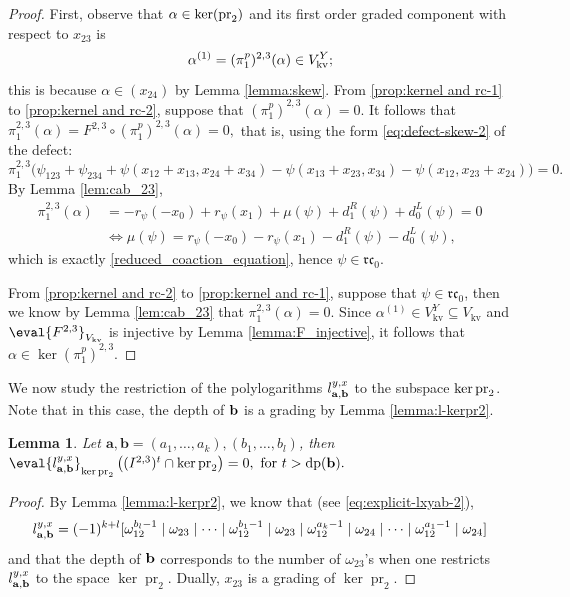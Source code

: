 \documentclass[a4paper,fleqn]{cas-sc}
\newtheorem{lemma}[theorem]{Lemma}
\DeclareMathOperator{\dpt}{dp}
\DeclareMathOperator{\pr}{pr}
\DeclareMathOperator{\kv}{kv}
\begin{document}
\begin{proof}
First, observe that $\alpha\in \ker (\rm{pr}_2)$ and its first order graded component with respect to $x_{23}$ is 
\begin{equation}\label{eq:alpha-graded-component-1}
    \alpha^{(1)}=(\pi^p_1)^{2,3}(\alpha)\in V^{Y}_{\rm{kv}};
\end{equation}
this is because $\alpha\in (x_{24})$ by Lemma \ref{lemma:skew}. %
From \eqref{prop:kernel and rc-1} to \eqref{prop:kernel and rc-2}, suppose that $(\pi^p_1)^{2,3}(\alpha)=0$. It follows that 
$
        \pi^{2,3}_1(\alpha)=F^{2,3}\circ (\pi^p_1)^{2,3}(\alpha)=0,
$
that is, using the form \eqref{eq:defect-skew-2} of the defect:
$$
\pi^{2,3}_1\big(\psi_{123}+\psi_{234}+\psi(x_{12}+x_{13},x_{24}+x_{34})-\psi(x_{13}+x_{23},x_{34})-\psi(x_{12},x_{23}+x_{24})\big)=0.
$$
By Lemma \ref{lem:cab_23},
\begin{align*}
   \pi_1^{2,3}(\alpha) & =-r_{\psi}(-x_0)+r_{\psi}(x_1)+\mu(\psi)+d^R_1(\psi)+d^L_0(\psi) = 0\\
   & \iff \mu(\psi) = r_{\psi}(-x_0) - r_{\psi}(x_1) - d^R_1(\psi) - d^L_0(\psi),
\end{align*}
which is exactly \eqref{reduced_coaction_equation}, hence $\psi\in \mathfrak{rc}_0$.

From \eqref{prop:kernel and rc-2} to \eqref{prop:kernel and rc-1}, suppose that $\psi \in \mathfrak{rc}_0$, then we know by  Lemma \ref{lem:cab_23} that $\pi^{2,3}_1(\alpha)=0$. Since $\alpha^{(1)} \in V^Y_{\kv} \subseteq V_{\kv}$ and $\eval{F^{2,3}}_{V_{\rm{kv}}}$ is injective by Lemma \ref{lemma:F_injective}, it follows that $\alpha\in \ker (\pi^p_1)^{2,3}$.
\end{proof}


We now study the restriction of the polylogarithms $l^{y,x}_{\bf{a},\bf{b}}$ to the subspace $\ker \rm{pr}_2$. Note that in this case, the depth of $\bf{b}$ is a grading by Lemma \ref{lemma:l-kerpr2}.

\begin{lemma}\label{lemma:filtration}
Let $\textbf{a},\textbf{b}=(a_1, \ldots, a_k),(b_1, \ldots, b_l)$, then 
	$
		\eval{l^{y,x}_{\bf{a},\bf{b}}}_{\ker \pr_2}\left( (I^{2,3})^t\cap \ker \pr_2 \right) =0, \text{ for } t> \dpt(\bf{b}).
	$
\end{lemma}


\begin{proof}
By Lemma \ref{lemma:l-kerpr2}, we know that (see \eqref{eq:explicit-lxyab-2}),
$$
		l^{y,x}_{\bf{a},\bf{b}}  =(-1)^{k+l}[\omega^{b_l-1}_{12}\mid\omega_{23}\mid\dots \mid\omega^{b_1-1}_{12}\mid\omega_{23}\mid\omega^{a_k-1}_{12}\mid\omega_{24}\mid\dots \mid\omega^{a_1-1}_{12}\mid\omega_{24}]
$$
and that the depth of $\bf{b}$ corresponds to the number of $\omega_{23}$'s when one restricts $l^{y,x}_{\bf{a},\bf{b}}$ to the space $\ker \pr_2$. Dually, $x_{23}$ is a grading of $\ker \pr_2$.
\end{proof}
\end{document}
